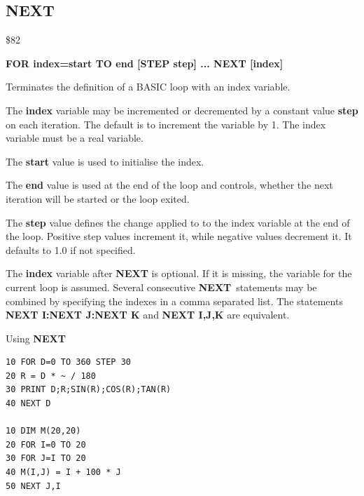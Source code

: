 \subsection{NEXT}
\begin{description}[leftmargin=2cm,style=nextline]
\item [Token:] \$82
\item [Format:] {\bf FOR index=start TO end [STEP step] ... NEXT [index]}
\item [Usage:] Terminates the definition
               of a BASIC loop with an index variable.

               The {\bf index} variable may be incremented or decremented
               by a constant value {\bf step} on each iteration. The default
               is to increment the variable by 1.
               The index variable must be a real variable.

               The {\bf start} value is used to initialise the index.

               The {\bf end} value is used at the end of the loop
               and controls, whether the next iteration will be started
               or the loop exited.

               The {\bf step} value defines the change applied to
               to the index variable at the end of the loop.
               Positive step values increment it, while negative values
               decrement it. It defaults to 1.0 if not specified.

\item [Remarks:] The {\bf index} variable after {\bf NEXT} is
               optional. If it is missing, the variable
               for the current loop is assumed.
               Several consecutive {\bf NEXT} statements may be
               combined by specifying the indexes in a comma
               separated list. The statements
               {\bf NEXT I:NEXT J:NEXT K} and
               {\bf NEXT I,J,K} are equivalent.

\item [Example:] Using {\bf NEXT}
\begin{tcolorbox}[colback=black,coltext=white]
\verbatimfont{\codefont}
\begin{verbatim}
10 FOR D=0 TO 360 STEP 30
20 R = D * ~ / 180
30 PRINT D;R;SIN(R);COS(R);TAN(R)
40 NEXT D

10 DIM M(20,20)
20 FOR I=0 TO 20
30 FOR J=I TO 20
40 M(I,J) = I + 100 * J
50 NEXT J,I
\end{verbatim}
\end{tcolorbox}
\end{description}

